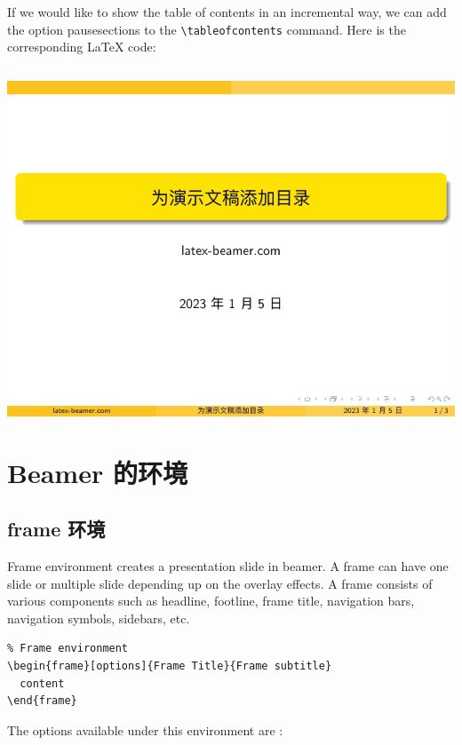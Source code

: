 If we would like to show the table of contents in an incremental way, we can add the option {\ttfamily pausesections} to the \verb|\tableofcontents| command. Here is the corresponding {\LaTeX} code:

\inputminted[linenos=true]{latex}{examples/beamer/outline-pausesections.tex}

\includegraphics[page=2]{examples/beamer/outline-pausesections.pdf}

\section{Beamer 的环境}

\subsection{{\ttfamily frame} 环境}

Frame environment creates a presentation slide in beamer. A frame can have one slide or multiple slide depending up on the overlay effects. A frame consists of various components such as headline, footline, frame title, navigation bars, navigation symbols, sidebars, etc. 

\begin{verbatim}
% Frame environment
\begin{frame}[options]{Frame Title}{Frame subtitle}
  content
\end{frame}
\end{verbatim}

The options available under this environment are :

